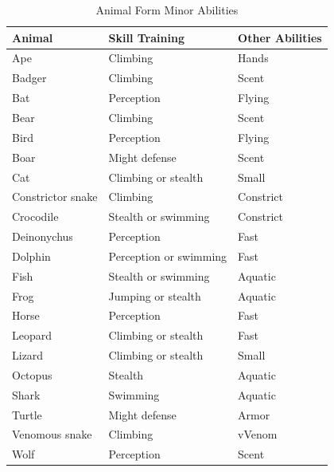 \begin{table}[h]
\centering 
\caption{Animal Form Minor Abilities}
\label{tab:Animal Form Minor Abilities}

\begin{tabularx}{\textwidth}{| Y | Y | Y |}
\hline

\textbf{Animal} & \textbf{Skill Training} & \textbf{Other Abilities} \\ \hline

Ape	& Climbing	& Hands \\ \hline
Badger	& Climbing	& Scent  \\ \hline
Bat & Perception	& 	Flying \\ \hline
Bear	& Climbing	& 	Scent \\ \hline
Bird	& 	Perception	& 	Flying \\ \hline
Boar	& 	Might defense		& Scent \\ \hline
Cat		& Climbing or stealth	& 	Small \\ \hline
Constrictor snake		& Climbing		& Constrict \\ \hline
Crocodile	& 	Stealth or swimming		& Constrict \\ \hline 
Deinonychus		& Perception		& Fast \\ \hline
Dolphin	& 	Perception or swimming	& 	Fast \\ \hline
Fish		& Stealth or swimming		& Aquatic \\ \hline
Frog		& Jumping or stealth		& Aquatic \\ \hline
Horse		& Perception		& Fast \\ \hline
Leopard		& Climbing or stealth	& 	Fast \\ \hline
Lizard		& Climbing or stealth		& Small \\ \hline
Octopus		& Stealth		& Aquatic \\ \hline
Shark		& Swimming 		& Aquatic \\ \hline
Turtle		& Might defense		& Armor \\ \hline
Venomous snake	& 	Climbing		& vVenom \\ \hline
Wolf		& Perception		& Scent \\ \hline

\end{tabularx}
\end{table}

